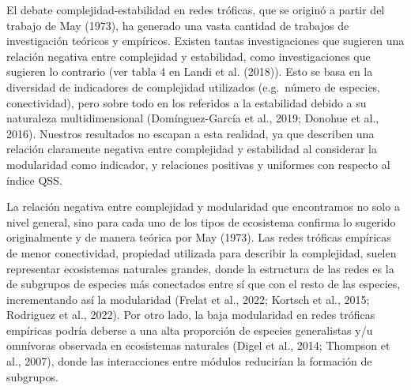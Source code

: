 \documentclass[
]{article}
\begin{document}
El debate complejidad-estabilidad en redes tróficas, que se originó a
partir del trabajo de May (1973), ha generado una vasta cantidad de
trabajos de investigación teóricos y empíricos. Existen tantas
investigaciones que sugieren una relación negativa entre complejidad y
estabilidad, como investigaciones que sugieren lo contrario (ver tabla 4
en Landi et al. (2018)). Esto se basa en la diversidad de indicadores de
complejidad utilizados (e.g.~número de especies, conectividad), pero
sobre todo en los referidos a la estabilidad debido a su naturaleza
multidimensional (Domínguez-García et al., 2019; Donohue et al., 2016).
Nuestros resultados no escapan a esta realidad, ya que describen una
relación claramente negativa entre complejidad y estabilidad al
considerar la modularidad como indicador, y relaciones positivas y
uniformes con respecto al índice QSS.

La relación negativa entre complejidad y modularidad que encontramos no
solo a nivel general, sino para cada uno de los tipos de ecosistema
confirma lo sugerido originalmente y de manera teórica por May (1973).
Las redes tróficas empíricas de menor conectividad, propiedad utilizada
para describir la complejidad, suelen representar ecosistemas naturales
grandes, donde la estructura de las redes es la de subgrupos de especies
más conectados entre sí que con el resto de las especies, incrementando
así la modularidad (Frelat et al., 2022; Kortsch et al., 2015; Rodriguez
et al., 2022). Por otro lado, la baja modularidad en redes tróficas
empíricas podría deberse a una alta proporción de especies generalistas
y/u omnívoras observada en ecosistemas naturales (Digel et al., 2014;
Thompson et al., 2007), donde las interacciones entre módulos reducirían
la formación de subgrupos.
\end{document}
